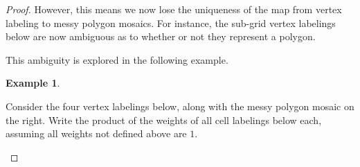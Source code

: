\documentclass[12pt]{article}
\theoremstyle{plain}
\theoremstyle{definition}
\theoremstyle{remark}
\theoremstyle{definition}
\newtheorem{exmp}{Example}[section]
\newcommand{\cell}[4]{ \draw[thick] ( #1 , #2 ) rectangle ( #3 , #4 );}
\newcommand{\lablvertex}[3]{\node[shape=circle,draw=none,fill=white, inner sep=2pt,minimum size=5pt] (A) at ( #1 , #2 ) {#3};}
\begin{document}
\begin{proof}
However, this means we now lose the uniqueness of the map from vertex labeling to messy polygon mosaics. For instance, the sub-grid vertex labelings below are now ambiguous as to whether or not they represent a polygon.

\begin{center}
\end{center}

This ambiguity is explored in the following example.

\begin{exmp}\label{exmp: iep}

Consider the four vertex labelings below, along with the messy polygon mosaic on the right. Write the product of the weights of all cell labelings below each, assuming all weights not defined above are $1$.

\begin{center}
\end{center}
\end{exmp}
\end{proof}
\end{document}

